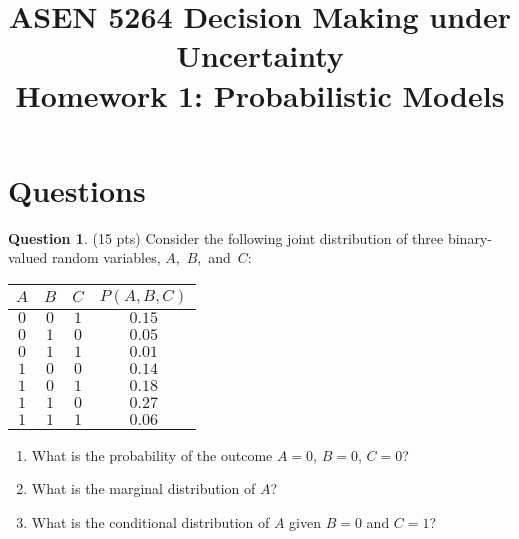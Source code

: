 \documentclass{article}
\title{ASEN 5264 Decision Making under Uncertainty\\
       Homework 1: Probabilistic Models}
\theoremstyle{definition}
\newtheorem{question}[thm]{Question}
\begin{document}
\maketitle

\section{Questions}

\begin{question} (15 pts)
    Consider the following joint distribution of three binary-valued random variables, \mbox{$A$, $B$, and $C$}:

    \begin{minipage}{0.3\linewidth}
        \vspace{1em}
    {\small
    \begin{tabular}{cccc}
        \toprule
            $A$ & $B$ & $C$ & $P(A,B,C)$ \\
        \midrule
            $0$ & $0$ & $1$ & $0.15$ \\
            $0$ & $1$ & $0$ & $0.05$ \\
            $0$ & $1$ & $1$ & $0.01$ \\
            $1$ & $0$ & $0$ & $0.14$ \\
            $1$ & $0$ & $1$ & $0.18$ \\
            $1$ & $1$ & $0$ & $0.27$ \\
            $1$ & $1$ & $1$ & $0.06$ \\
        \bottomrule
    \end{tabular}
    }
    \end{minipage}
    \begin{minipage}{0.7\linewidth}
        \begin{enumerate}[label=\alph*)]
            \item What is the probability of the outcome $A=0$, $B=0$, $C=0$?
            \item What is the marginal distribution of $A$?
            \item What is the conditional distribution of $A$ given $B=0$ and $C=1$?
        \end{enumerate}
    \end{minipage}
\end{question}
\end{document}
